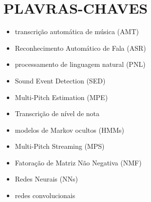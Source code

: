 \documentclass{article}
\begin{document}
\section{PLAVRAS-CHAVES}
\begin{itemize}
    \item transcrição automática de música (AMT)
    \item Reconhecimento Automático de Fala (ASR)
    \item processamento de linguagem natural (PNL)
    \item Sound Event Detection (SED)
    \item Multi-Pitch Estimation (MPE)
    \item Transcrição de nível de nota
    \item modelos de Markov ocultos (HMMs)
    \item Multi-Pitch Streaming (MPS)
    \item Fatoração de Matriz Não Negativa (NMF)
    \item Redes Neurais (NNs)
    \item redes convolucionais
\end{itemize}
\end{document}
